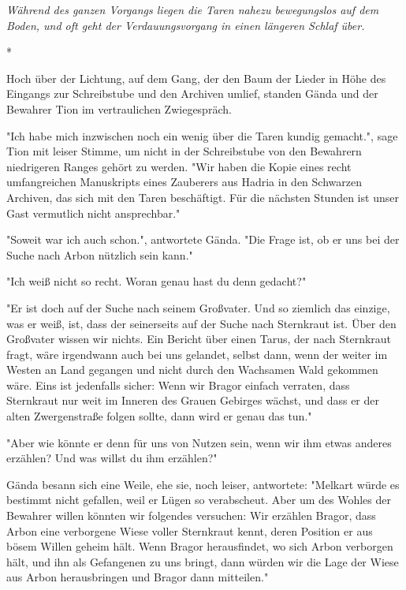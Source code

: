 \documentclass[10pt, a4paper, oneside]{book}
\begin{document}
\begin{multicols}{2}
\textit{Während des ganzen Vorgangs liegen die Taren nahezu bewegungslos auf dem Boden, und oft geht der Verdauungsvorgang in einen längeren Schlaf über.} 

\begin{center}
    *
\end{center}

Hoch über der Lichtung, auf dem Gang, der den Baum der Lieder in Höhe des Eingangs zur Schreibstube und den Archiven umlief, standen Gända und der Bewahrer Tion im vertraulichen Zwiegespräch. 

"Ich habe mich inzwischen noch ein wenig über die Taren kundig gemacht.", sage Tion mit leiser Stimme, um nicht in der Schreibstube von den Bewahrern niedrigeren Ranges gehört zu werden. "Wir haben die Kopie eines recht umfangreichen Manuskripts eines Zauberers aus Hadria in den Schwarzen Archiven, das sich mit den Taren beschäftigt. Für die nächsten Stunden ist unser Gast vermutlich nicht ansprechbar." 

"Soweit war ich auch schon.", antwortete Gända. "Die Frage ist, ob er uns bei der Suche nach Arbon nützlich sein kann." 

"Ich weiß nicht so recht. Woran genau hast du denn gedacht?" 

"Er ist doch auf der Suche nach seinem Großvater. Und so ziemlich das einzige, was er weiß, ist, dass der seinerseits auf der Suche nach Sternkraut ist. Über den Großvater wissen wir nichts. Ein Bericht über einen Tarus, der nach Sternkraut fragt, wäre irgendwann auch bei uns gelandet, selbst dann, wenn der weiter im Westen an Land gegangen und nicht durch den Wachsamen Wald gekommen wäre. Eins ist jedenfalls sicher: Wenn wir Bragor einfach verraten, dass Sternkraut nur weit im Inneren des Grauen Gebirges wächst, und dass er der alten Zwergenstraße folgen sollte, dann wird er genau das tun." 

"Aber wie könnte er denn für uns von Nutzen sein, wenn wir ihm etwas anderes erzählen? Und was willst du ihm erzählen?" 

Gända besann sich eine Weile, ehe sie, noch leiser, antwortete: "Melkart würde es bestimmt nicht gefallen, weil er Lügen so verabscheut. Aber um des Wohles der Bewahrer willen könnten wir folgendes versuchen: Wir erzählen Bragor, dass Arbon eine verborgene Wiese voller Sternkraut kennt, deren Position er aus bösem Willen geheim hält. Wenn Bragor herausfindet, wo sich Arbon verborgen hält, und ihn als Gefangenen zu uns bringt, dann würden wir die Lage der Wiese aus Arbon herausbringen und Bragor dann mitteilen." 


\end{multicols}
\end{document}

